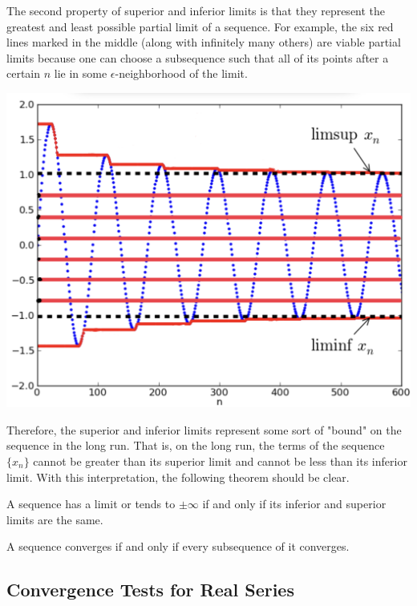 \documentclass{article}
\begin{document}
\begin{definition}
      The second property of superior and inferior limits is that they represent the greatest and least possible partial limit of a sequence. For example, the six red lines marked in the middle (along with infinitely many others) are viable partial limits because one can choose a subsequence such that all of its points after a certain $n$ lie in some $\epsilon$-neighborhood of the limit. 
      \begin{center}
        \includegraphics[scale=0.12]{img/Sup_Inf_Limits_as_Limit_Bounds.jpeg}
      \end{center}
      Therefore, the superior and inferior limits represent some sort of "bound" on the sequence in the long run. That is, on the long run, the terms of the sequence $\{x_n\}$ cannot be greater than its superior limit and cannot be less than its inferior limit. With this interpretation, the following theorem should be clear. 
    \end{definition}

    \begin{theorem}
      A sequence has a limit or tends to $\pm \infty$ if and only if its inferior and superior limits are the same. 
    \end{theorem}

    \begin{corollary}
      A sequence converges if and only if every subsequence of it converges. 
    \end{corollary}

  \subsection{Convergence Tests for Real Series}
\end{document}
